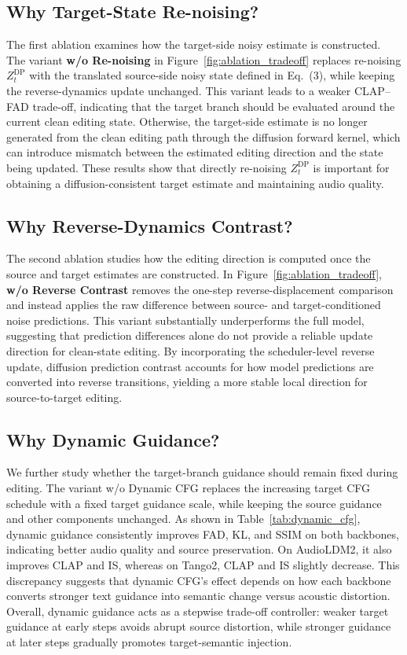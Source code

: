 \subsection{Why Target-State Re-noising?}

The first ablation examines how the target-side noisy estimate is constructed.
The variant {\color{freshmint}\textbf{w/o Re-noising}} in Figure~\ref{fig:ablation_tradeoff} replaces re-noising $Z_t^{\text{DP}}$ with the translated source-side noisy state defined in Eq.~(3), while keeping the reverse-dynamics update unchanged.
This variant leads to a weaker CLAP--FAD trade-off, indicating that the target branch should be evaluated around the current clean editing state.
Otherwise, the target-side estimate is no longer generated from the clean editing path through the diffusion forward kernel, which can introduce mismatch between the estimated editing direction and the state being updated.
These results show that directly re-noising $Z_t^{\text{DP}}$ is important for obtaining a diffusion-consistent target estimate and maintaining audio quality.

\subsection{Why Reverse-Dynamics Contrast?}

The second ablation studies how the editing direction is computed once the source and target estimates are constructed.
In Figure~\ref{fig:ablation_tradeoff}, {\color{freshcoral}\textbf{w/o Reverse Contrast}} removes the one-step reverse-displacement comparison and instead applies the raw difference between source- and target-conditioned noise predictions.
This variant substantially underperforms the full model, suggesting that prediction differences alone do not provide a reliable update direction for clean-state editing.
By incorporating the scheduler-level reverse update, diffusion prediction contrast accounts for how model predictions are converted into reverse transitions, yielding a more stable local direction for source-to-target editing.

\subsection{Why Dynamic Guidance?}

We further study whether the target-branch guidance should remain fixed during editing.
The variant w/o Dynamic CFG replaces the increasing target CFG schedule with a fixed target guidance scale, while keeping the source guidance and other components unchanged.
As shown in Table~\ref{tab:dynamic_cfg}, dynamic guidance consistently improves FAD, KL, and SSIM on both backbones, indicating better audio quality and source preservation.
On AudioLDM2, it also improves CLAP and IS, whereas on Tango2, CLAP and IS slightly decrease. This discrepancy suggests that dynamic CFG's effect depends on how each backbone converts stronger text guidance into semantic change versus acoustic distortion.
Overall, dynamic guidance acts as a stepwise trade-off controller: weaker target guidance at early steps avoids abrupt source distortion, while stronger guidance at later steps gradually promotes target-semantic injection.

